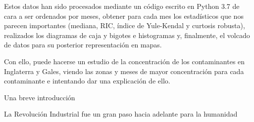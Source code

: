 \documentclass[12pt]{article}
\begin{document}
Estos datos han sido procesados mediante un código escrito en Python 3.7 de cara a ser ordenados por meses, obtener para cada mes los estadísticos que nos parecen importantes (mediana, RIC, índice de Yule-Kendal y curtosis robusta), realizados los diagramas de caja y bigotes e histogramas y, finalmente, el volcado de datos para su posterior representación en mapas.

Con ello, puede hacerse un estudio de la concentración de los contaminantes en Inglaterra y Gales, viendo las zonas y meses de mayor concentración para cada contaminante e intentando dar una explicación de ello.

\newpage

\Huge Una breve introducción
%

\normalsize La Revolución Industrial fue un gran paso hacia adelante para la humanidad
\end{document}
